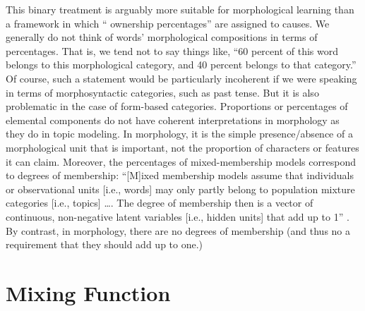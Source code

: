 This binary treatment 
is arguably more suitable for
morphological learning than a framework in which `` ownership percentages'' are assigned to causes.
We generally do not think of words' morphological compositions in 
terms of percentages.  That is, we tend not to say things like, ``60 percent 
of this word belongs to this morphological category, and 40 percent belongs 
to that category.'' Of course, such a statement would be particularly incoherent 
if we were speaking in terms of morphosyntactic categories, such as past tense. 
But it is also problematic in the case of form-based categories. Proportions or percentages of elemental components
do not have coherent interpretations in morphology as they do in topic modeling.
In morphology, it is the simple presence/absence 
of a morphological unit that is important, not the proportion of characters 
or features it can claim. Moreover, the percentages of mixed-membership 
models correspond to degrees of membership:  
``[M]ixed membership models assume that individuals or observational units 
[i.e., words] may only partly belong to population mixture categories [i.e., topics] \dots. 
The degree of membership then is a vector of continuous, 
non-negative latent variables [i.e., hidden units] that add up to 1'' \citep[][p. 4]{airoldi-et-al:2014}. 
By contrast, in morphology, there are no degrees of membership (and thus
no a requirement that they should add up to one.)

				
\section{Mixing Function}
\label{sec:mixing-function}

